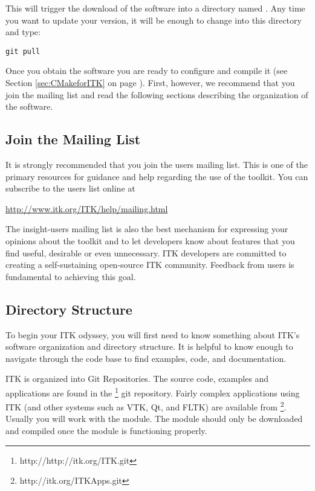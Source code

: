 This will trigger the download of the software into a directory named
.  Any time you want to update your version, it will be enough to
change into this directory  and type:
\begin{verbatim}
git pull
\end{verbatim}

Once you obtain the software you are ready to configure and compile it (see
Section \ref{sec:CMakeforITK} on page \pageref{sec:CMakeforITK}). First,
however, we recommend that you join the mailing list and read the following
sections describing the organization of the software.

\subsection{Join the Mailing List}
\label{sec:JoinMailList}


It is strongly recommended that you join the users mailing list. This is one
of the primary resources for guidance and help regarding the use of the
toolkit. You can subscribe to the users list online at

\begin{center}
\url{http://www.itk.org/ITK/help/mailing.html}
\end{center}

The insight-users mailing list is also the best mechanism for expressing your
opinions about the toolkit and to let developers know about features that you
find useful, desirable or even unnecessary. ITK developers are committed to
creating a self-sustaining open-source ITK community. Feedback from users is
fundamental to achieving this goal.

\subsection{Directory Structure}
\label{sec:DirectoryStructure}

To begin your ITK odyssey, you will first need to know something about
ITK's software organization and directory structure. It is helpful to
know enough to navigate through the code base to find examples, code,
and documentation.

ITK is organized into Git Repositories. The source code, examples and
applications are found in the
\footnote{http://http://itk.org/ITK.git} git
repository. Fairly complex applications using ITK (and other systems
such as VTK, Qt, and FLTK) are available from
\footnote{http://itk.org/ITKApps.git}. Usually
you will work with the  module. The  module should
only be downloaded and compiled once the  module is
functioning properly.

